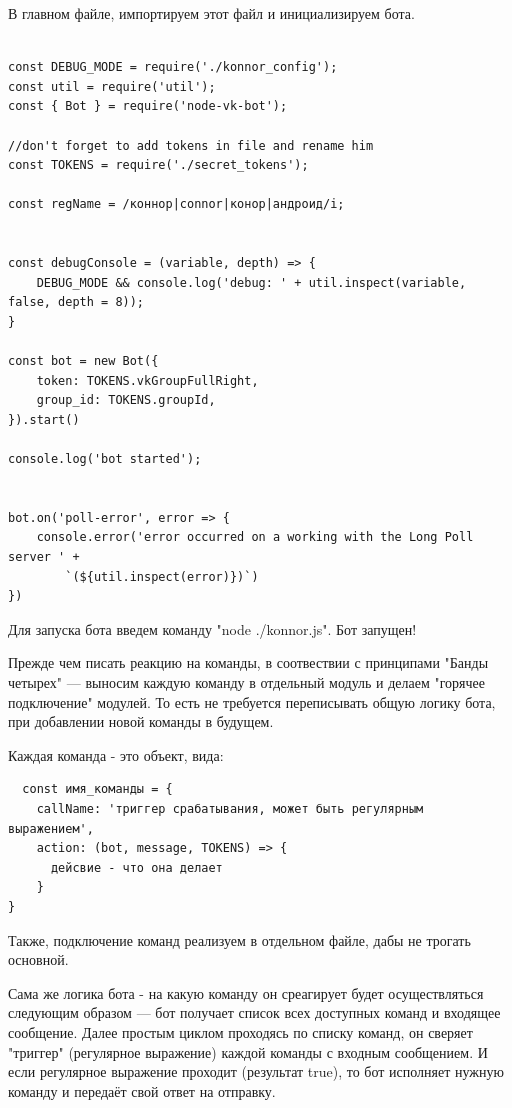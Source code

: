 \documentclass[bachelor, och, coursework, times]{SCWorks}
\begin{document}
В главном файле, импортируем этот файл и инициализируем бота.

\begin{lstlisting}

const DEBUG_MODE = require('./konnor_config');
const util = require('util');
const { Bot } = require('node-vk-bot');

//don't forget to add tokens in file and rename him
const TOKENS = require('./secret_tokens');

const regName = /коннор|connor|конор|андроид/i;


const debugConsole = (variable, depth) => {
    DEBUG_MODE && console.log('debug: ' + util.inspect(variable, false, depth = 8));
}

const bot = new Bot({
    token: TOKENS.vkGroupFullRight,
    group_id: TOKENS.groupId,
}).start()

console.log('bot started');


bot.on('poll-error', error => {
    console.error('error occurred on a working with the Long Poll server ' +
        `(${util.inspect(error)})`)
})

\end{lstlisting}

Для запуска бота введем команду "node ./konnor.js". Бот запущен!

Прежде чем писать реакцию на команды, в соотвествии с принципами "Банды четырех" \cite{Gang} --- 
выносим каждую команду в отдельный модуль и делаем "горячее подключение" модулей. То есть не требуется 
переписывать общую логику бота, при добавлении новой команды в будущем.

Каждая команда - это объект, вида:
\begin{lstlisting}
  const имя_команды = {
    callName: 'триггер срабатывания, может быть регулярным выражением',
    action: (bot, message, TOKENS) => {
      дейсвие - что она делает
    }
}
\end{lstlisting}

Также, подключение команд реализуем в отдельном файле, дабы не трогать основной.

Сама же логика бота - на какую команду он среагирует будет осуществляться
следующим образом --- бот получает список всех доступных команд и входящее сообщение.
Далее простым циклом проходясь по списку команд, он сверяет "триггер" (регулярное выражение)
каждой команды с входным сообщением. И если регулярное выражение проходит (результат true),
то бот исполняет нужную команду и передаёт свой ответ на отправку.
\end{document}
